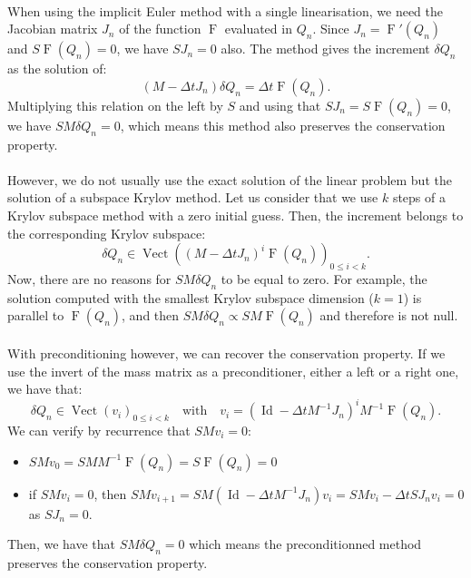     \paragraph{}
    When using the implicit Euler method with a single linearisation, we need the Jacobian matrix $J_n$ of the function $\operatorname{F}$ evaluated in $Q_n$.
    Since $J_n = \operatorname{F}'\left(Q_n\right)$ and $S\operatorname{F}\left(Q_n\right) = 0$, we have $SJ_n = 0$ also.
    The method gives the increment $\delta Q_n$ as the solution of:
    \begin{equation}
      \left(M - \Delta t J_n\right) \delta Q_n = \Delta t \operatorname{F}\left(Q_n\right) .
    \end{equation}
    Multiplying this relation on the left by $S$ and using that $SJ_n = S\operatorname{F}\left(Q_n\right) = 0$, we have $SM\delta Q_n = 0$, which means this method also preserves the conservation property.

    \paragraph{}
    However, we do not usually use the exact solution of the linear problem but the solution of a subspace Krylov method.
    Let us consider that we use $k$ steps of a Krylov subspace method with a zero initial guess.
    Then, the increment belongs to the corresponding Krylov subspace:
    \begin{equation}
      \delta Q_n \in \operatorname{Vect}\left( \left(M - \Delta t J_n\right)^i \operatorname{F}\left(Q_n\right) \right)_{0\leq i < k} .
    \end{equation}
    Now, there are no reasons for $SM\delta Q_n$ to be equal to zero.
    For example, the solution computed with the smallest Krylov subspace dimension ($k = 1$) is parallel to $\operatorname{F}\left(Q_n\right)$, and then $SM\delta Q_n \propto SM\operatorname{F}\left(Q_n\right)$ and therefore is not null.

    \paragraph{}
    With preconditioning however, we can recover the conservation property.
    If we use the invert of the mass matrix as a preconditioner, either a left or a right one, we have that:
    \begin{equation}
      \delta Q_n \in \operatorname{Vect}\left(v_i\right)_{0\leq i < k} \quad\textrm{with}\quad v_i = \left(\operatorname{Id} - \Delta t M^{-1} J_n \right)^i M^{-1} \operatorname{F}\left(Q_n\right) .
    \end{equation}
    We can verify by recurrence that $SMv_i = 0$:
    \begin{itemize}
      \item $SMv_0 = SMM^{-1}\operatorname{F}\left(Q_n\right) = S\operatorname{F}\left(Q_n\right) = 0$
      \item if $SMv_i = 0$, then $SMv_{i+1} = SM \left(\operatorname{Id} - \Delta t M^{-1} J_n \right) v_i = SMv_i - \Delta t S J_n v_i = 0$ as $SJ_n = 0$.
    \end{itemize}
    Then, we have that $SM\delta Q_n = 0$ which means the preconditionned method preserves the conservation property.
